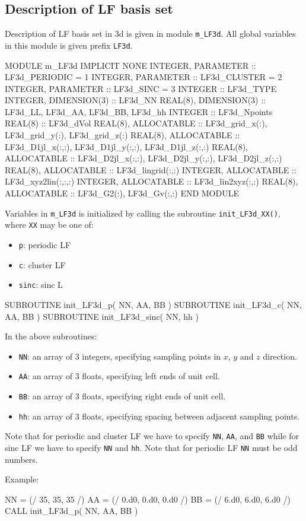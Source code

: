 \subsection{Description of LF basis set}

Description of LF basis set in 3d is given in module
{\tt m\_LF3d}. All global variables in this module is given
prefix {\tt LF3d}.

\begin{fortrancode}
MODULE m_LF3d
  IMPLICIT NONE
  INTEGER, PARAMETER :: LF3d_PERIODIC = 1
  INTEGER, PARAMETER :: LF3d_CLUSTER  = 2
  INTEGER, PARAMETER :: LF3d_SINC     = 3
  INTEGER :: LF3d_TYPE
  INTEGER, DIMENSION(3) :: LF3d_NN
  REAL(8), DIMENSION(3) :: LF3d_LL, LF3d_AA, LF3d_BB, LF3d_hh
  INTEGER :: LF3d_Npoints
  REAL(8) :: LF3d_dVol
  REAL(8), ALLOCATABLE :: LF3d_grid_x(:), LF3d_grid_y(:), LF3d_grid_z(:)
  REAL(8), ALLOCATABLE :: LF3d_D1jl_x(:,:), LF3d_D1jl_y(:,:), LF3d_D1jl_z(:,:)
  REAL(8), ALLOCATABLE :: LF3d_D2jl_x(:,:), LF3d_D2jl_y(:,:), LF3d_D2jl_z(:,:)
  REAL(8), ALLOCATABLE :: LF3d_lingrid(:,:)
  INTEGER, ALLOCATABLE :: LF3d_xyz2lin(:,:,:)
  INTEGER, ALLOCATABLE :: LF3d_lin2xyz(:,:)
  REAL(8), ALLOCATABLE :: LF3d_G2(:), LF3d_Gv(:,:)
END MODULE
\end{fortrancode}

Variables in {\tt m\_LF3d} is initialized by calling the subroutine
{\tt init\_LF3d\_XX()}, where {\tt XX} may be one of:
\begin{itemize}
\item {\tt p}: periodic LF
\item {\tt c}: cluster LF
\item {\tt sinc}: sinc L
\end{itemize}

\begin{fortrancode}
SUBROUTINE init_LF3d_p( NN, AA, BB )
SUBROUTINE init_LF3d_c( NN, AA, BB )
SUBROUTINE init_LF3d_sinc( NN, hh )
\end{fortrancode}

In the above subroutines:
\begin{itemize}
\item {\tt NN}: an array of 3 integers, specifying sampling points in $x$,
$y$ and $z$ direction.
\item {\tt AA}: an array of 3 floats, specifying left ends of unit cell.
\item {\tt BB}: an array of 3 floats, specifying right ends of unit cell.
\item {\tt hh}: an array of 3 floats, specifying spacing between adjacent sampling points.
\end{itemize}

Note that for periodic and cluster LF we have to specify {\tt NN}, {\tt AA}, and {\tt BB}
while for sinc LF we have to specify {\tt NN} and {\tt hh}.
Note that for periodic LF {\tt NN} must be odd numbers.

Example:
\begin{fortrancode}
NN = (/ 35, 35, 35 /)
AA = (/ 0.d0, 0.d0, 0.d0 /)
BB = (/ 6.d0, 6.d0, 6.d0 /)
CALL init_LF3d_p( NN, AA, BB )
\end{fortrancode}
